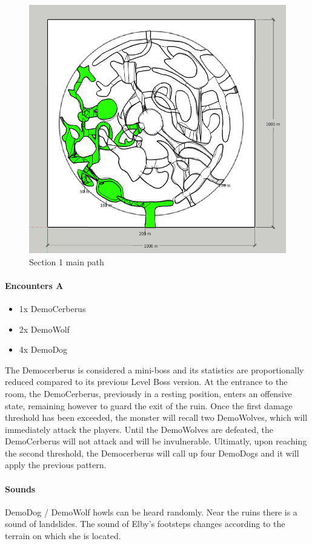\begin{figure}[H]
	\centering
	\includegraphics[width=0.8\linewidth]{images/map/2D_map_section_01.png}
	\caption*{Section 1 main path}
\end{figure}


\paragraph{Encounters A}
\begin{itemize}
	\item 1x DemoCerberus
	\item 2x DemoWolf
	\item 4x DemoDog
\end{itemize}

The Democerberus is considered a mini-boss and its statistics are proportionally reduced compared to its previous Level Boss version. At the entrance to the room, the DemoCerberus, previously in a resting position, enters an offensive state, remaining however to guard the exit of the ruin. Once the first damage threshold has been exceeded, the monster will recall two DemoWolves, which will immediately attack the players. Until the DemoWolves are defeated, the DemoCerberus will not attack and will be invulnerable. Ultimatly, upon reaching the second threshold, the Democerberus will call up four DemoDogs and it will apply the previous pattern.

\paragraph{Sounds}
DemoDog / DemoWolf howls can be heard randomly. Near the ruins there is a sound of landslides. The sound of Elby's footsteps changes according to the terrain on which she is located.

